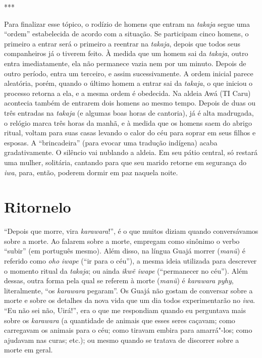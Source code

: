 \begin{center}
***
\end{center}

Para finalizar esse tópico, o rodízio de homens que entram na
\emph{takaja} segue uma ``ordem'' estabelecida de acordo com a situação.
Se participam cinco homens, o primeiro a entrar será o primeiro a
reentrar na \emph{takaja}, depois que todos seus companheiros já o
tiverem feito. À medida que um homem sai da \emph{takaja}, outro entra
imediatamente, ela não permanece vazia nem por um minuto. Depois de
outro período, entra um terceiro, e assim sucessivamente. A ordem
inicial parece aleatória, porém, quando o último homem a entrar sai da
\emph{takaja}, o que iniciou o processo retorna a ela, e a mesma ordem é
obedecida. Na aldeia Awá (TI Caru) acontecia também de entrarem dois
homens ao mesmo tempo. Depois de duas ou três entradas na \emph{takaja}
(e algumas boas horas de cantoria), já é alta madrugada, o relógio marca
três horas da manhã, e à medida que os homens saem do abrigo ritual,
voltam para suas casas levando o calor do céu para soprar em seus filhos
e esposas. A ``brincadeira'' (para evocar uma tradução indígena) acaba
gradativamente. O silêncio vai nublando a aldeia. Em seu pátio central,
só restará uma mulher, solitária, cantando para que seu marido retorne
em segurança do \emph{iwa}, para, então, poderem dormir em paz naquela
noite.

\section{Ritornelo}\label{ritornelo}

``Depois que morre, vira \emph{karawara}!'', é o que muitos diziam quando
conversávamos sobre a morte. Ao falarem sobre a morte, empregam como
sinônimo o verbo ``subir'' (em português mesmo). Além disso, na língua
Guajá morrer (\emph{manũ}) é referido como \emph{oho iwape} (``ir para o
céu''), a mesma ideia utilizada para descrever o momento ritual da
\emph{takaja}; ou ainda \emph{ikwẽ iwape} (``permanecer no céu''). Além
dessas, outra forma pela qual se referem à morte (\emph{manũ}) é
\emph{karawara} \emph{pyhy}, literalmente, ``os \emph{karawara} pegaram''.
Os Guajá não gostam de conversar sobre a morte e sobre os detalhes da
nova vida que um dia todos experimentarão no \emph{iwa}. ``Eu não sei
não, Uirá!'', era o que me respondiam quando eu perguntava mais sobre os
\emph{karawara} (a quantidade de animais que esses seres caçavam; como
carregavam os animais para o céu; como tiravam embira para amarrá"-los;
como ajudavam nas curas; etc.); ou mesmo quando se tratava de discorrer
sobre a morte em geral.

